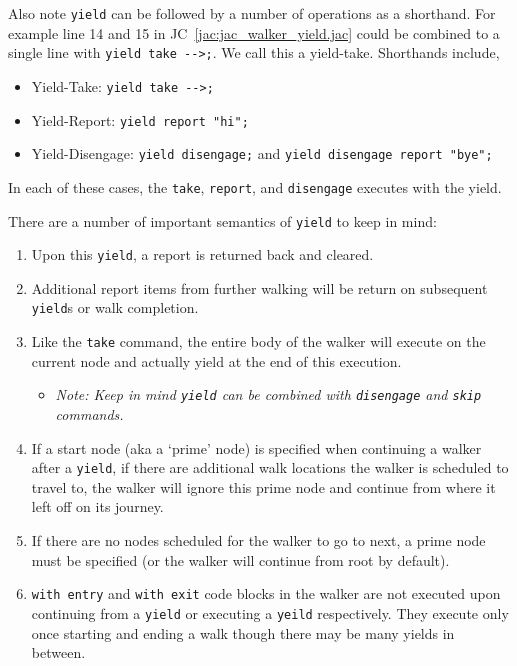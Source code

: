 \par
Also note \lstinline{yield} can be followed by a number of operations as a shorthand. For example line 14 and 15 in JC~\ref{jac:jac_walker_yield.jac} could be combined to a single line with \lstinline{yield take -->;}. We call this a yield-take. Shorthands include,
\begin{itemize}
    \item Yield-Take: \lstinline{yield take -->;}
    \item Yield-Report: \lstinline{yield report "hi";}
    \item Yield-Disengage: \lstinline{yield disengage;} and \lstinline{yield disengage report "bye";}
\end{itemize}
In each of these cases, the \lstinline{take}, \lstinline{report}, and \lstinline{disengage} executes with the yield.

\par
There are a number of important semantics of \lstinline{yield} to keep in mind:
\begin{enumerate}
    \item Upon this \lstinline{yield}, a report is returned back and cleared.
    \item Additional report items from further walking will be return on subsequent \lstinline{yield}s or walk completion.
    \item Like the \lstinline{take} command, the entire body of the walker will execute on the current node and actually yield at the end of this execution.
    \begin{itemize}
        \item \emph{Note: Keep in mind \lstinline{yield} can be combined with \lstinline{disengage} and \lstinline{skip} commands.}
    \end{itemize}
    \item If a start node (aka a `prime' node) is specified when continuing a walker after a \lstinline{yield}, if there are additional walk locations the walker is scheduled to travel to, the walker will ignore this prime node and continue from where it left off on its journey.
    \item If there are no nodes scheduled for the walker to go to next, a prime node must be specified (or the walker will continue from root by default).
    \item \lstinline{with entry} and \lstinline{with exit} code blocks in the walker are not executed upon continuing from a \lstinline{yield} or executing a \lstinline{yeild} respectively. They execute only once starting and ending a walk though there may be many yields in between.
\end{enumerate}
